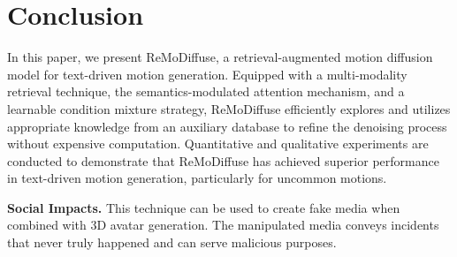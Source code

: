 \documentclass[10pt,twocolumn,letterpaper]{article}
\newcommand{\name}{ReMoDiffuse\xspace}
\begin{document}
 \section{Conclusion}

In this paper, we present \name, a retrieval-augmented motion diffusion model for text-driven motion generation. Equipped with a multi-modality retrieval technique, the semantics-modulated attention mechanism, and a learnable condition mixture strategy, \name efficiently explores and utilizes appropriate knowledge from an auxiliary database to refine the denoising process without expensive computation. Quantitative and qualitative experiments are conducted to demonstrate that \name has achieved superior performance in text-driven motion generation, particularly for uncommon motions. 

\noindent\textbf{Social Impacts.} This technique can be used to create fake media when combined with 3D avatar generation. The manipulated media conveys incidents that never truly happened and can serve malicious purposes.

 



\clearpage
{\small


}
\end{document}
